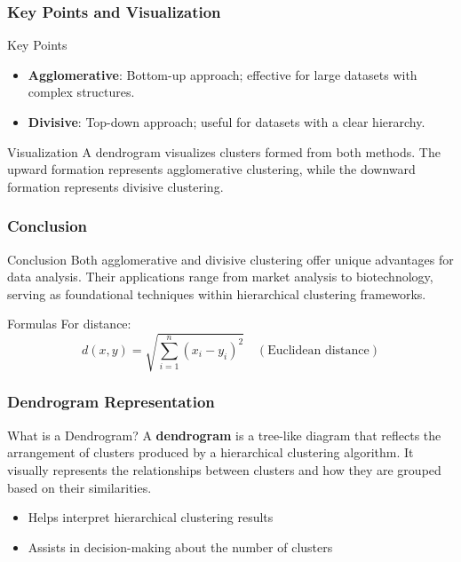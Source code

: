 \documentclass[aspectratio=169]{beamer}
\begin{document}
\begin{frame}[fragile]
    \frametitle{Key Points and Visualization}
    \begin{block}{Key Points}
        \begin{itemize}
            \item \textbf{Agglomerative}: Bottom-up approach; effective for large datasets with complex structures.
            \item \textbf{Divisive}: Top-down approach; useful for datasets with a clear hierarchy.
        \end{itemize}
    \end{block}

    \begin{block}{Visualization}
        A dendrogram visualizes clusters formed from both methods. The upward formation represents agglomerative clustering, while the downward formation represents divisive clustering.
    \end{block}
\end{frame}

\begin{frame}[fragile]
    \frametitle{Conclusion}
    \begin{block}{Conclusion}
        Both agglomerative and divisive clustering offer unique advantages for data analysis. Their applications range from market analysis to biotechnology, serving as foundational techniques within hierarchical clustering frameworks.
    \end{block}

    \begin{block}{Formulas}
        For distance:
        \[
        d(x, y) = \sqrt{\sum_{i=1}^n (x_i - y_i)^2} \quad (\text{Euclidean distance})
        \]
    \end{block}
\end{frame}

\begin{frame}[fragile]
    \frametitle{Dendrogram Representation}
    \begin{block}{What is a Dendrogram?}
        A \textbf{dendrogram} is a tree-like diagram that reflects the arrangement of clusters produced by a hierarchical clustering algorithm. It visually represents the relationships between clusters and how they are grouped based on their similarities.
    \end{block}
    \begin{itemize}
        \item Helps interpret hierarchical clustering results
        \item Assists in decision-making about the number of clusters
    \end{itemize}
\end{frame}
\end{document}
